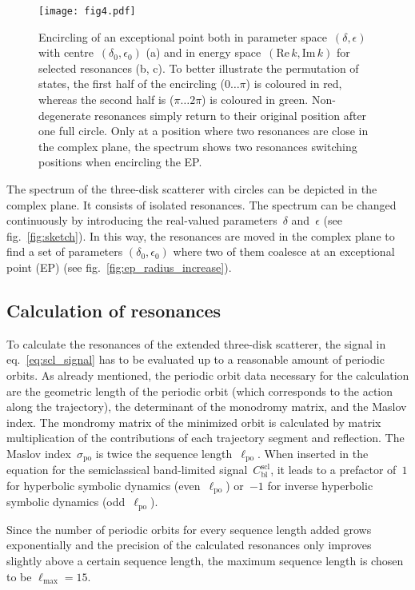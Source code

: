 \documentclass[doublecol]{epl2}
\renewcommand{\Re}{\mathrm{Re}\,}
\renewcommand{\Im}{\mathrm{Im}\,}
\begin{document}
\begin{figure}[t]
  \centering
  \texttt{[image: fig4.pdf]}
  \caption{Encircling of an exceptional point both in parameter space~$(\delta, \epsilon)$ with centre~$(\delta_0, \epsilon_0)$ (a) and in energy space~$(\Re k, \Im k)$ for selected resonances (b, c). To better illustrate the permutation of states, the first half of the encircling ($0 \dots \pi$) is coloured in red, whereas the second half is ($\pi \dots 2\pi$) is coloured in green. Non-degenerate resonances simply return to their original position after one full circle. Only at a position where two resonances are close in the complex plane, the spectrum shows two resonances switching positions when encircling the EP.}
  \label{fig:ep_orbit}
\end{figure}

The spectrum of the three-disk scatterer with circles can be depicted in the complex plane. It consists of isolated resonances. The spectrum can be changed continuously by introducing the real-valued parameters~$\delta$ and~$\epsilon$ (see fig.~\ref{fig:sketch}). In this way, the resonances are moved in the complex plane to find a set of parameters $(\delta_0, \epsilon_0)$ where two of them coalesce at an exceptional point (EP) (see fig.~\ref{fig:ep_radius_increase}).

\subsection{Calculation of resonances}
To calculate the resonances of the extended three-disk scatterer, the signal in eq.~\eqref{eq:scl_signal} has to be evaluated up to a reasonable amount of periodic orbits. As already mentioned, the periodic orbit data necessary for the calculation are the geometric length of the periodic orbit (which corresponds to the action along the trajectory), the determinant of the monodromy matrix, and the Maslov index. The mondromy matrix of the minimized orbit is calculated by matrix multiplication of the contributions of each trajectory segment and reflection. The Maslov index~$\sigma_\mathrm{po}$ is twice the sequence length~$\ell_\mathrm{po}$. When inserted in the equation for the semiclassical band-limited signal~$C^\mathrm{scl}_\mathrm{bl}$, it leads to a prefactor of~$1$ for hyperbolic symbolic dynamics (even~$\ell_\mathrm{po}$) or~$-1$ for inverse hyperbolic symbolic dynamics (odd~$\ell_\mathrm{po}$).

Since the number of periodic orbits for every sequence length added grows exponentially and the precision of the calculated resonances only improves slightly above a certain sequence length, the maximum sequence length is chosen to be $\ell_\mathrm{max} = 15$.
\end{document}
